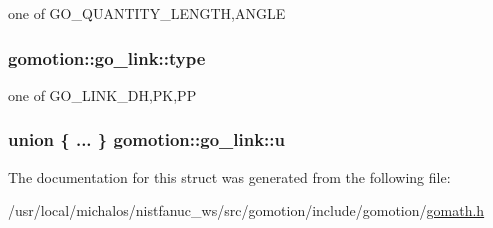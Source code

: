 one of G\-O\-\_\-\-Q\-U\-A\-N\-T\-I\-T\-Y\-\_\-\-L\-E\-N\-G\-T\-H,A\-N\-G\-L\-E \hypertarget{structgomotion_1_1go__link_ad159e1d034c86635efc11a6b0c34dc7e}{
\subsubsection[{type}]{ gomotion\-::go\-\_\-link\-::type}}\label{structgomotion_1_1go__link_ad159e1d034c86635efc11a6b0c34dc7e}
one of G\-O\-\_\-\-L\-I\-N\-K\-\_\-\-D\-H,P\-K,P\-P \hypertarget{structgomotion_1_1go__link_aacb42b16b578a2fbf1b7c25b18cafe2b}{
\subsubsection[{u}]{\setlength{\rightskip}{0pt plus 5cm}union \{ ... \}   gomotion\-::go\-\_\-link\-::u}}\label{structgomotion_1_1go__link_aacb42b16b578a2fbf1b7c25b18cafe2b}


The documentation for this struct was generated from the following file\-:\begin{DoxyCompactItemize}
\item 
/usr/local/michalos/nistfanuc\-\_\-ws/src/gomotion/include/gomotion/\hyperlink{gomath_8h}{gomath.\-h}\end{DoxyCompactItemize}
